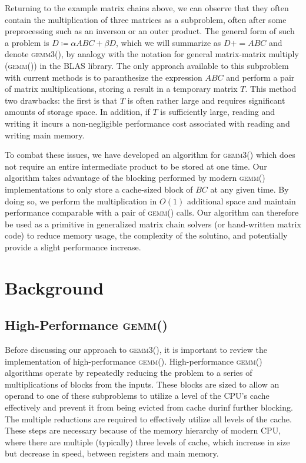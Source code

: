\documentclass[12pt]{article}
\newcommand*{\pluseq}{\mathrel{{+}{=}}}
\newcommand*{\gemmt}{{\textsc{gemm3()}}}
\newcommand*{\gemm}{{\textsc{gemm()}}}
\begin{document}
Returning to the example matrix chains above, we can observe that they often contain the multiplication of three matrices as a subproblem, often after some preprocessing such as an inverson or an outer product.
The general form of such a problem is $D \coloneqq \alpha ABC + \beta D$, which we will summarize as $D \pluseq ABC$ and denote \gemmt{}, by analogy with the notation for general matrix-matrix multiply (\gemm{}) in the BLAS library.
The only approach available to this subproblem with current methods is to paranthesize the expression $ABC$ and perform a pair of matrix multiplications, storing a result in a temporary matrix $T$.
This method two drawbacks: the first is that $T$ is often rather large and requires significant amounts of storage space.
In addition, if $T$ is sufficiently large, reading and writing it incurs a non-negligible performance cost associated with reading and writing main memory.

To combat these issues, we have developed an algorithm for \gemmt{} which does not require an entire intermediate product to be stored at one time.
Our algorithm takes advantage of the blocking performed by modern \gemm{} implementations to only store a cache-sized block of $BC$ at any given time.
By doing so, we perform the multiplication in $O(1)$ additional space and maintain performance comparable with a pair of \gemm{} calls.
Our algorithm can therefore be used as a primitive in generalized matrix chain solvers (or hand-written matrix code) to reduce memory usage, the complexity of the solutino, and potentially provide a slight performance increase.

\section{Background}
\subsection{High-Performance \gemm{}}
Before discussing our approach to \gemmt{}, it is important to review the implementation of high-performance \gemm{}.
High-performance \gemm{} algorithms operate by repeatedly reducing the problem to a series of multiplications of blocks from the inputs.
These blocks are sized to allow an operand to one of these subproblems to utilize a level of the CPU's cache effectively and prevent it from being evicted from cache durinf further blocking.
The multiple reductions are required to effectively utilize all levels of the cache.
These steps are necessary because of the memory hierarchy of modern CPU, where there are multiple (typically) three levels of cache, which increase in size but decrease in speed, between registers and main memory.
\end{document}
